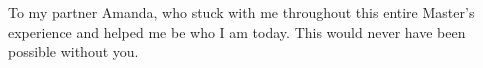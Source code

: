 %
%
%

\begin{dedication}
To my partner Amanda, who stuck with me throughout this entire Master's experience and helped me be who I am today. This would never have been possible without you.  
\end{dedication}

\pagebreak